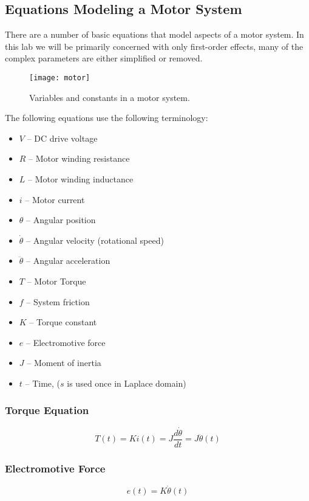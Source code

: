 \documentclass[openany,11pt,fleqn]{book} %
\begin{document}
\subsection{Equations Modeling a Motor System}

There are a number of basic equations that model aspects of a motor system. In this lab we will be primarily concerned with only first-order effects, many of the complex parameters are either simplified or removed. 

\begin{figure}[tb]
    \centering\texttt{[image: motor]}
    \caption{Variables and constants in a motor system.}
    \label{motor_sys}
\end{figure}

The following equations use the following terminology:
\begin{itemize}
    \item $V$ -- DC drive voltage
    \item $R$ -- Motor winding resistance
    \item $L$ -- Motor winding inductance 
    \item $i$ -- Motor current 
    \item $\theta$ -- Angular position
    \item $\dot{\theta}$ -- Angular velocity (rotational speed)
    \item $\ddot{\theta}$ -- Angular acceleration
    \item $T$ -- Motor Torque
    \item $f$ -- System friction
    \item $K$ -- Torque constant
    \item $e$ -- Electromotive force
    \item $J$ -- Moment of inertia
    \item $t$ -- Time, ($s$ is used once in Laplace domain) 
\end{itemize}

\subsubsection{Torque Equation}
\begin{equation}
T(t) = Ki(t) = J\frac{d\dot{\theta}}{dt}=J\ddot{\theta}(t) 
\end{equation}

\subsubsection{Electromotive Force}
\begin{equation}
e(t) = K\dot{\theta}(t)
\end{equation}
\end{document}
